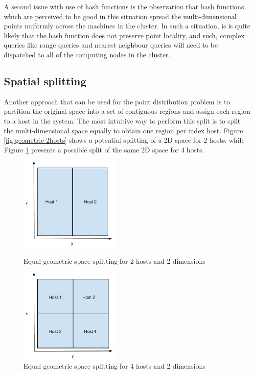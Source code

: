\documentclass[11pt,a4paper]{globis-book}
\begin{document}
A second issue with use of hash functions is the observation that hash functions which are perceived to be good in this situation spread the multi-dimensional points uniformly across the machines in the cluster. In such a situation, is is quite likely that the hash function does not preserve point locality, and such, complex queries like range queries and nearest neighbour queries will need to be dispatched to all of the computing nodes in the cluster. 

\subsection{Spatial splitting}

Another approach that can be used for the point distribution problem is to partition the original space into a set of contiguous regions and assign each region to a host in the system. The most intuitive way to perform this split is to split the multi-dimensional space equally to obtain one region per index host. Figure \ref{fig:geometric-2hosts} shows a potential splitting of a 2D space for 2 hosts, while Figure \ref{fig:geometric-4hosts} presents a possible split of the same 2D space for 4 hosts. 

\begin{figure}[h]
\centering
\parbox{5cm}{
    \includegraphics[width=5cm]{images/geometric-2hosts}
    \caption{Equal geometric space splitting for 2 hosts and 2 dimensions}
    \label{fig:geometric-2hosts}}
\qquad
\begin{minipage}{5cm}
    \includegraphics[width=5cm]{images/geometric-4hosts}
    \caption{Equal geometric space splitting for 4 hosts and 2 dimensions}
    \label{fig:geometric-4hosts}
\end{minipage}
\end{figure}
\end{document}
